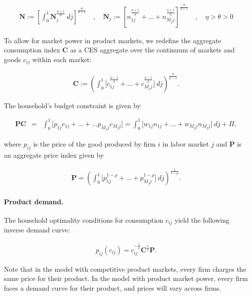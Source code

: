 \documentclass[12pt]{article}
\theoremstyle{prop}
\begin{document}
\begin{align*}
	\mathbf{N}  :=  \left[\int_0^1 \mathbf{N}_{j}^{\frac{\theta+1}{\theta}}\:dj\right]^{\frac{\theta}{\theta+1}}
    \quad,\quad 
	\mathbf{N}_{j} := \left[n_{1j}^{\frac{\eta+1}{\eta}}+\dots + n_{M_{j}j}^{\frac{\eta+1}{\eta}}\right]^{\frac{\eta}{\eta+1}}
 \quad,\quad
 \eta>\theta>0
\end{align*}

 To allow for market power in product markets, we redefine the aggregate consumption index $\mathbf{C}$ as a CES aggregate over the continuum of markets and goods $c_{ij}$ within each market:

\begin{align*}
	\mathbf{C} := \left(\int_0^1 \Big[c_{1j}^{\frac{\rho-1}{\rho}}+\dots + c_{M_{j}j}^{\frac{\rho-1}{\rho}}\Big] \:dj\right)^{\frac{\rho}{\rho-1}}.
\end{align*}

The household's budget constraint is given by

\vspace*{-.2cm}\begin{eqnarray*}
	\mathbf{P} \mathbf{C} &=& \int_0^1 \Big[p_{1j}c_{1j} + \ldots +\ldots p_{M_{j}j}c_{M_{j}j}\Big]=\int_0^1 \Big[w_{1j}n_{1j}+\dots + w_{M_{j}j}n_{M_{j}j}\Big]\:dj   + \Pi,
 \end{eqnarray*}

where $p_{ij}$ is the price of the good produced by firm $i$ in labor market $j$ and $\mathbf{P}$ is an aggregate price index given by

\begin{align*}
    \mathbf{P} = \left(\int_0^1 \Big[p_{1j}^{1-\rho}+\dots + p_{M_{j}j}^{1-\rho}\Big] \:dj\right)^{\frac{1}{1-\rho}}. 
\end{align*}

\paragraph{Product demand.} The household optimality conditions for consumption $c_{ij}$ yield the following inverse demand curve:

\begin{align*}
    p_{ij}(c_{ij}) = c_{ij}^{-\frac{1}{\rho}} \mathbf{C}^{\frac{1}{\rho}} \mathbf{P}. 
\end{align*}

Note that in the model with competitive product markets, every firm charges the same price for their product. In the model with product market power, every firm faces a demand curve for their product, and prices will vary across firms.
\end{document}
